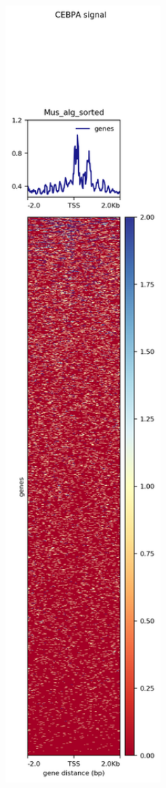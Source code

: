 \documentclass[
]{article}
\begin{document}
\begin{center}\includegraphics[width=300px]{./T04_images/CEBPA_genes2} \end{center}
\end{document}
